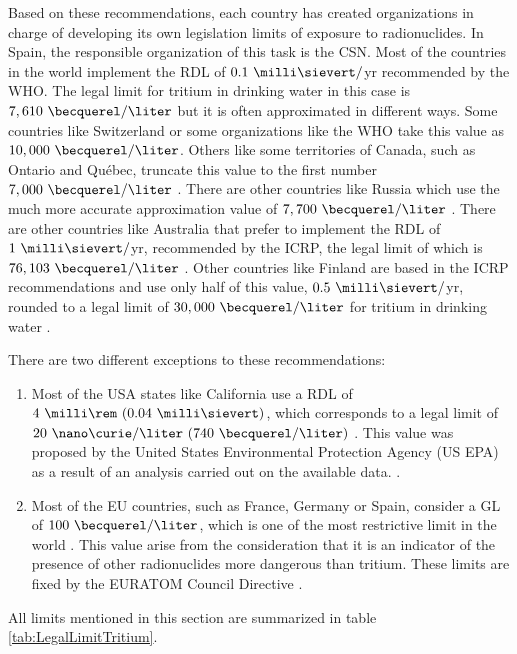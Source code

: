 Based on these recommendations, each country has created organizations in charge of developing its own legislation limits of exposure to radionuclides. In Spain, the responsible organization of this task is the CSN. Most of the countries in the world implement the RDL of $0.1~\milli\sievert/$yr recommended by the WHO. The legal limit for tritium in drinking water in this case is $7,610~\becquerel/\liter$  but it is often approximated in different ways. Some countries like Switzerland \cite{Switzerland_GL} or some organizations like the WHO \cite{WHO_GL} take this value as $10,000~\becquerel/\liter$. Others like some territories of Canada, such as Ontario and Québec, truncate this value to the first number $7,000~\becquerel/\liter$ \cite{Ontario_GL, Quebec_GL}. There are other countries like Russia which use the much more accurate approximation value of $7,700~\becquerel/\liter$ \cite{Russia_GL}. There are other countries like Australia that prefer to implement the RDL of $1~\milli\sievert/$yr, recommended by the ICRP, the legal limit of which is $76,103~\becquerel/\liter$ \cite{Australia_GL}. Other countries like Finland are based in the ICRP recommendations and use only half of this value, $0.5~\milli\sievert/$yr, rounded to a legal limit of $30,000~\becquerel/\liter$ for tritium in drinking water \cite{Finland_GL}.

There are two different exceptions to these recommendations:
\begin{enumerate}
\item{} Most of the USA states like California use a RDL of $4~\milli\rem~(0.04~\milli\sievert)$, which corresponds to a legal limit of $20~\nano\curie/\liter~(740~\becquerel/\liter)$ \cite{California_GL}. This value was proposed by the United States Environmental Protection Agency (US EPA) as a result of an analysis carried out on the available data. \cite{USEPA_GL}.

\item{} Most of the EU countries, such as France, Germany or Spain, consider a GL of $100~\becquerel/\liter$, which is one of the most restrictive limit in the world \cite{France_GL, Germany_GL, Spain_GL}. This value arise from the consideration that it is an indicator of the presence of other radionuclides more dangerous than tritium. These limits are fixed by the EURATOM Council Directive \cite{EURATOM_GL}. 
\end{enumerate}

All limits mentioned in this section are summarized in table \ref{tab:LegalLimitTritium}.

